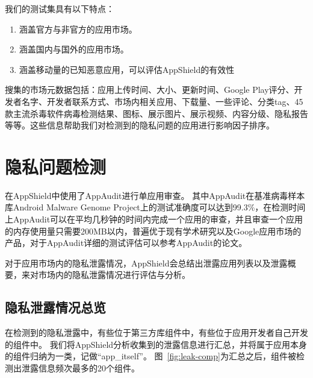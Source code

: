 我们的测试集具有以下特点：

\begin{enumerate}
	\item 涵盖官方与非官方的应用市场。
	\item 涵盖国内与国外的应用市场。
	\item 涵盖移动量的已知恶意应用，可以评估AppShield的有效性
\end{enumerate}

搜集的市场元数据包括：应用上传时间、大小、更新时间、Google Play评分、开发者名字、开发者联系方式、市场内相关应用、下载量、一些评论、分类tag、45款主流杀毒软件病毒检测结果、图标、展示图片、展示视频、内容分级、隐私报告等等。这些信息帮助我们对检测到的隐私问题的应用进行影响因子排序。

\section{隐私问题检测}
\label{sec:privacy-eval}

在AppShield中使用了AppAudit进行单应用审查。
其中AppAudit在基准病毒样本库Android Malware Genome Project上的测试准确度可以达到99.3\%，在检测时间上AppAudit可以在平均几秒钟的时间内完成一个应用的审查，并且审查一个应用的内存使用量只需要200MB以内，普遍优于现有学术研究以及Google应用市场的产品，对于AppAudit详细的测试评估可以参考AppAudit的论文。

对于应用市场内的隐私泄露情况，AppShield会总结出泄露应用列表以及泄露概要，来对市场内的隐私泄露情况进行评估与分析。

\subsection{隐私泄露情况总览}

在检测到的隐私泄露中，有些位于第三方库组件中，有些位于应用开发者自己开发的组件中。
我们将AppShield分析收集到的泄露信息进行汇总，并将属于应用本身的组件归纳为一类，记做“app\_itself”。
图~\ref{fig:leak-comp}为汇总之后，组件被检测出泄露信息频次最多的20个组件。

